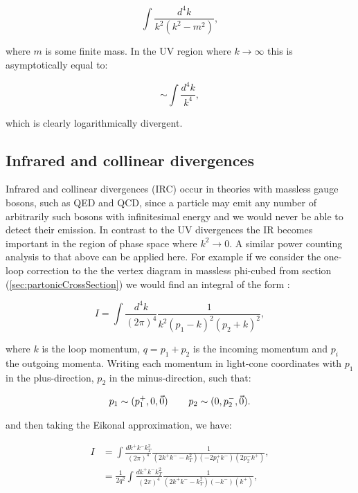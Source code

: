 		\begin{equation}
			\int \frac{d^4k}{k^2(k^2-m^2)},
		\end{equation}

		where $m$ is some finite mass. In the UV region where $k\rightarrow\infty$ this is asymptotically equal
		to:

		\begin{equation}
			\sim\int\frac{d^4k}{k^4},
		\end{equation}

		which is clearly logarithmically divergent.

	\subsection{Infrared and collinear divergences}

		Infrared and collinear divergences (IRC) occur in theories with massless gauge bosons, such as
		QED and QCD, since a particle may emit any number of arbitrarily such bosons with infinitesimal
		energy and we would never be able to detect their emission.  In contrast to the UV divergences
		the IR becomes important in the region of phase space where $k^2\rightarrow0$.  A similar power
		counting analysis to that above can be applied here.  For example if we consider the one-loop
		correction to the the vertex diagram in massless phi-cubed from section (\ref{sec:partonicCrossSection})
		we would find an integral of the form \cite{Sterman:1995fz}:

		\begin{equation}
			I = \int\frac{d^4k}{(2\pi)^4}\frac{1}{k^2(p_1-k)^2(p_2+k)^2},
		\end{equation}

		where $k$ is the loop momentum, $q=p_1+p_2$ is the incoming momentum and $p_i$ the outgoing
		momenta.  Writing each momentum in light-cone coordinates with $p_1$ in the plus-direction,
		$p_2$ in the minus-direction, such that:

		\begin{align}
			p_1 \sim (p_1^+, 0, \vec{0}) \hspace{0.75cm} p_2 \sim (0, p_2^-, \vec{0}).
		\end{align}

		and then taking the Eikonal approximation, we have:

		\begin{align}
			I &= \int\frac{dk^+k^-k^2_T}{(2\pi)^4}\frac{1}{(2k^+k^- - k_T^2)(-2p_1^+k^-)(2p_2^-k^+)},\\
			  &= \frac{1}{2q^2}\int\frac{dk^+k^-k^2_T}{(2\pi)^4}\frac{1}{(2k^+k^- - k_T^2)(-k^-)(k^+)},
			  \label{eqn:IRCscaling}
		\end{align}

